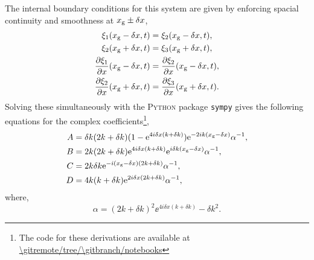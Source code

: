 The internal boundary conditions for this system are given by enforcing spacial continuity and smoothness at \(x_{{\mathrm{g}}} \pm \delta x\),
%
\begin{equation}
    \begin{split}
        \xi_1(x_{{\mathrm{g}}} - \delta x, t) &= \xi_2(x_{{\mathrm{g}}} - \delta x, t), \\
        \xi_2(x_{{\mathrm{g}}} + \delta x, t) &= \xi_3(x_{{\mathrm{g}}} + \delta x, t), \\
        \frac{\partial \xi_1}{\partial x}(x_{{\mathrm{g}}} - \delta x, t) &= \frac{\partial \xi_2}{\partial x}(x_{{\mathrm{g}}} - \delta x, t), \\
        \frac{\partial \xi_2}{\partial x}(x_{{\mathrm{g}}} + \delta x, t) &= \frac{\partial \xi_3}{\partial x}(x_{{\mathrm{g}}} + \delta x, t).
    \end{split}
\end{equation}
%
Solving these simultaneously with the \textsc{Python} package \texttt{sympy} \citep{Meurer.Smith.ea2017} gives the following equations for the complex coefficients\footnote{The code for these derivations are available at \url{\gitremote/tree/\gitbranch/notebooks}},
%
\begin{align}
    A &= \delta k (2k + \delta k) (1 - \mathrm{e}^{4i \delta x (k + \delta k)}) \mathrm{e}^{- 2i k (x_{{\mathrm{g}}} - \delta x)} \alpha^{-1}, \\
    B &= 2 k (2k + \delta k) \mathrm{e}^{4i \delta x (k + \delta k)} \mathrm{e}^{i \delta k (x_{{\mathrm{g}}} - \delta x)} \alpha^{-1}, \\
    C &= 2 k \delta k \mathrm{e}^{- i (x_{{\mathrm{g}}} - \delta x) (2k + \delta k)} \alpha^{-1}, \\
    D &= 4 k (k + \delta k) \mathrm{e}^{2 i \delta x (2k + \delta k)} \alpha^{-1},
\end{align}
%
where,
\begin{equation}
    \alpha = (2k + \delta k)^2 \ee^{4 i \delta x (k + \delta k)} - \delta k^2.
\end{equation}
%

